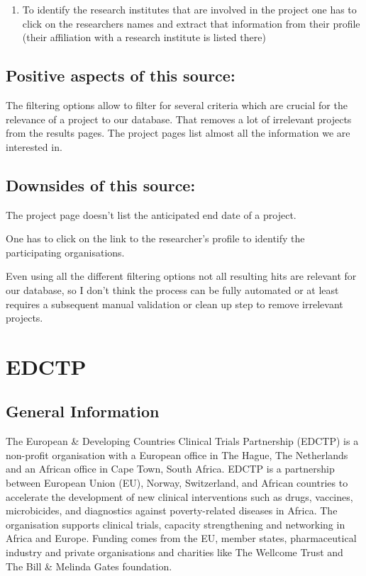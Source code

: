 \documentclass[
]{book}
\providecommand{\tightlist}{%
  \setlength{\itemsep}{0pt}\setlength{\parskip}{0pt}}
\begin{document}
\begin{enumerate}
\def\labelenumi{\arabic{enumi}.}
\setcounter{enumi}{9}
\tightlist
\item
  To identify the research institutes that are involved in the project one has to click on the researchers names and extract that information from their profile (their affiliation with a research institute is listed there)
\end{enumerate}

\hypertarget{positive-aspects-of-this-source}{%
\subsection{Positive aspects of this source:}\label{positive-aspects-of-this-source}}

The filtering options allow to filter for several criteria which are crucial for the relevance of a project to our database. That removes a lot of irrelevant projects from the results pages. The project pages list almost all the information we are interested in.

\hypertarget{downsides-of-this-source}{%
\subsection{Downsides of this source:}\label{downsides-of-this-source}}

The project page doesn't list the anticipated end date of a project.

One has to click on the link to the researcher's profile to identify the participating organisations.

Even using all the different filtering options not all resulting hits are relevant for our database, so I don't think the process can be fully automated or at least requires a subsequent manual validation or clean up step to remove irrelevant projects.

\hypertarget{update-edctp}{%
\section{EDCTP}\label{update-edctp}}

\hypertarget{general-information-2}{%
\subsection{General Information}\label{general-information-2}}

The European \& Developing Countries Clinical Trials Partnership (EDCTP) is a non-profit organisation with a European office in The Hague, The Netherlands and an African office in Cape Town, South Africa. EDCTP is a partnership between European Union (EU), Norway, Switzerland, and African countries to accelerate the development of new clinical interventions such as drugs, vaccines, microbicides, and diagnostics against poverty-related diseases in Africa. The organisation supports clinical trials, capacity strengthening and networking in Africa and Europe. Funding comes from the EU, member states, pharmaceutical industry and private organisations and charities like The Wellcome Trust and The Bill \& Melinda Gates foundation.
\end{document}
